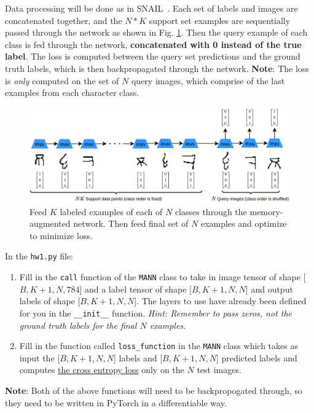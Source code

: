 \documentclass[12pt]{article}
\begin{document}
Data processing will be done as in SNAIL~\cite{DBLP:journals/corr/MishraRCA17}. Each set of labels and images are concatenated together, and the $N*K$ support set examples are sequentially passed through the network as shown in Fig. \ref{mann}. Then the query example of each class is fed through the network, \textbf{concatenated with 0 instead of the true label}. The loss is computed between the query set predictions and the ground truth labels, which is then backpropagated through the network. \textbf{Note}: The loss is \textit{only} computed on the set of $N$ query images, which comprise of the last examples from each character class. 

\begin{figure}
\centering
\includegraphics[width=\linewidth]{figures/hw1seq.png}
\vspace{-9mm}
\caption{Feed $K$ labeled examples of each of $N$ classes through the memory-augmented network. Then feed final set of $N$ examples and optimize to minimize loss.}
\label{mann}
\end{figure}



\noindent In the \texttt{hw1.py} file:
\begin{enumerate}
    \item Fill in the \texttt{call} function of the \texttt{MANN} class to take in image tensor of shape [$B, K+1, N, 784$] and a label tensor of shape [$B, K+1, N, N$] and output labels of shape [$B,K+1,N, N$]. The layers to use have already been defined for you in the \texttt{\_\_init\_\_} function. \textit{Hint: Remember to pass zeros, not the ground truth labels for the final $N$ examples.}
    \item  Fill in the function called \texttt{loss\_function} in the \texttt{MANN} class which takes as input the [$B,K+1,N, N$] labels and [$B,K+1,N, N$] predicted labels and computes \href{https://pytorch.org/docs/stable/generated/torch.nn.functional.cross_entropy.html#torch.nn.functional.cross_entropy}{the cross entropy loss} only on the $N$ test images. 
\end{enumerate}
\textbf{Note}: Both of the above functions will need to be backpropogated through, so they need to be written in PyTorch in a differentiable way.
\end{document}
